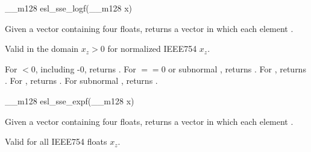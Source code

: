 \begin{sreapi}
\hypertarget{func:esl_sse_logf()}
{\item[\_\_m128 esl\_sse\_logf(\_\_m128 x)]}

Given a vector  containing four floats, returns a
vector  in which each element .

Valid in the domain $x_z > 0$ for normalized IEEE754
$x_z$.

For  $< 0$, including -0, returns . For  $==
0$ or subnormal , returns . For ,
returns . For , returns . For 
subnormal , returns .



\hypertarget{func:esl_sse_expf()}
{\item[\_\_m128 esl\_sse\_expf(\_\_m128 x)]}

Given a vector  containing four floats, returns a
vector  in which each element .

Valid for all IEEE754 floats $x_z$.



\end{sreapi}

